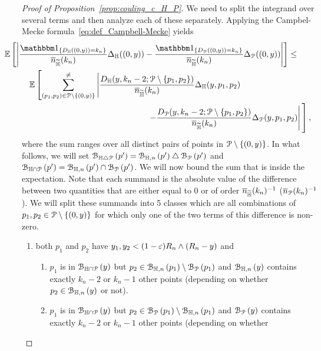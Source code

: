 \begin{proof}[Proof of Proposition~\ref{prop:couling_c_H_P}]
%

We need to split the integrand over several terms and then analyze each of these separately. Applying the Campbel-Mecke formula~\eqref{eq:def_Campbell-Mecke} yields
\begin{align*} 
 &\hspace{-30pt}\Exp{ \left| \frac{\ind{D_\H((0,y)) = k_n}}{\expH} \Delta_\H ((0,y) )
        - \frac{\ind{D_\Pcal((0,y)) = k_n}}{\expH}  \Delta_\Pcal ((0,y))
        \right|}\leq \\
 & {\mathbb E} \left[ \sum_{(p_1,p_2) \in \Pcal \setminus \{(0,y)\}}^{\not =} 
  \left| \frac{D_{\H}(y,k_n-2; \Pcal \setminus \{p_1,p_2 \})}{\expH} \Delta_\H (y,p_1,p_2) \right. \right.\\
  & \hspace{5cm} 
\left. \left. - \frac{D_{\Pcal} (y,k_n-2;\Pcal \setminus \{p_1,p_2\})}{\expH} \Delta_{\Pcal} (y,p_1,p_2)
   \right| \vphantom{\sum_{p_1,p_2 \in \Pcal \setminus \{(0,y)\}}^{\not =}}\right],
\end{align*}
where the sum ranges over all distinct pairs of points in ${\mathcal P} \setminus \{ (0,y)\}$. In what follows, we will set ${\mathcal B}_{\mathbb{H} \bigtriangleup {\mathcal P}}\left(p'\right) = {\mathcal B}_{\mathbb{H},n}\left(p'\right) \bigtriangleup {\mathcal B}_{{\mathcal P}}\left(p'\right)$ and ${\mathcal B}_{\mathbb{H} \cap {\mathcal P}}\left(p'\right) ={\mathcal B}_{\mathbb{H},n}\left(p'\right) \cap {\mathcal B}_{{\mathcal P}}\left(p'\right)$. 
We will now bound the sum that is inside the expectation. Note that each summand is the absolute value of the difference between two quantities that are either equal to 0 or of order $\overline{n}_{\widetilde{\mathbb{H}}}(k_n)^{-1}$ ($\overline{n}_{{\mathcal P}}(k_n)^{-1}$). We will split these summands into 5 classes which are all combinations of $p_1, p_2\in {\mathcal P} \setminus \{(0,y)\}$ for which only one of the two terms of this difference is non-zero. 
\begin{enumerate} 
\item both $p_1$ and $p_2$ have $y_1,y_2 < (1-\varepsilon ) R_n \wedge (R_n-y)$ and 
\begin{enumerate}
\item $p_1$ is in ${\mathcal B}_{\mathbb{H} \cap {\mathcal P}}\left(y\right)$ but $p_2 \in {\mathcal B}_{\mathbb{H},n}\left(p_1\right) \setminus {\mathcal B}_{{\mathcal P}}\left(p_1\right)$ 
and ${\mathcal B}_{\mathbb{H},n}\left(y\right)$ contains exactly $k_n-2$ or $k_n-1$ other points (depending on whether 
$p_2 \in {\mathcal B}_{\mathbb{H},n}\left(y\right)$ or not).
\item $p_1$ is in ${\mathcal B}_{\mathbb{H} \cap {\mathcal P}}\left(y\right)$ but $p_2 \in {\mathcal B}_{{\mathcal P}}\left(p_1\right) \setminus {\mathcal B}_{\mathbb{H},n}\left(p_1\right)$ 
and ${\mathcal B}_{{\mathcal P}}\left(y\right)$ contains exactly $k_n-2$ or $k_n-1$ other points (depending on whether 

\end{enumerate}
\end{enumerate}
\end{proof}
